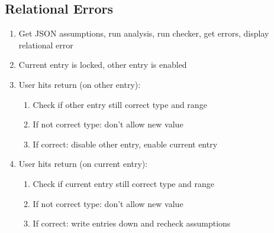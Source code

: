 \documentclass[11pt]{article}
\begin{document}

\subsection{Relational Errors}

\begin{enumerate}
  \item Get JSON assumptions, run analysis, run checker, get errors, display relational error
  \item Current entry is locked, other entry is enabled
  \item User hits return (on other entry):
  \begin{enumerate}
    \item Check if other entry still correct type and range
    \item If not correct type: don't allow new value
    \item If correct: disable other entry, enable current entry
  \end{enumerate}
  \item User hits return (on current entry):
  \begin{enumerate}
    \item Check if current entry still correct type and range
    \item If not correct type: don't allow new value
    \item If correct: write entries down and recheck assumptions
  \end{enumerate}
\end{enumerate}
\end{document}
